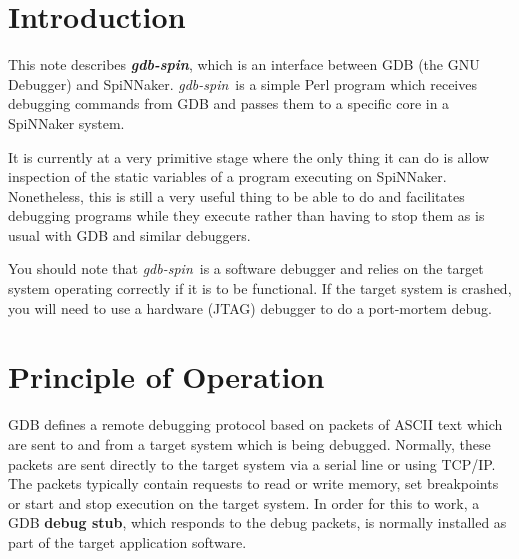 %
%
%

\def\FullTitle{\textsl{gdb-spin} - GDB SpiNNaker Interface}
\def\ShortTitle{\textsl{gdb-spin}}
\def\Date{8 Mar 2016}
\def\Version{2.0.0}
\def\Author{Steve Temple}
\def\Email{steven.temple@manchester.ac.uk}




\newcommand{\gdbspin}{\textsl{gdb-spin}}

\section{Introduction}

This note describes \textbf{\gdbspin}, which is an interface between
GDB (the GNU Debugger) and SpiNNaker. \gdbspin\ is a simple Perl
program which receives debugging commands from GDB and passes them to
a specific core in a SpiNNaker system.

It is currently at a very primitive stage where the only thing it can
do is allow inspection of the static variables of a program executing
on SpiNNaker. Nonetheless, this is still a very useful thing to be
able to do and facilitates debugging programs while they execute
rather than having to stop them as is usual with GDB and similar
debuggers.

You should note that \gdbspin\ is a software debugger and relies on
the target system operating correctly if it is to be functional. If
the target system is crashed, you will need to use a hardware (JTAG)
debugger to do a port-mortem debug.

\section{Principle of Operation}

GDB defines a remote debugging protocol based on packets of ASCII text
which are sent to and from a target system which is being
debugged. Normally, these packets are sent directly to the target
system via a serial line or using TCP/IP. The packets typically
contain requests to read or write memory, set breakpoints or start and
stop execution on the target system. In order for this to work, a
GDB \textbf{debug stub}, which responds to the debug packets, is
normally installed as part of the target application software.

